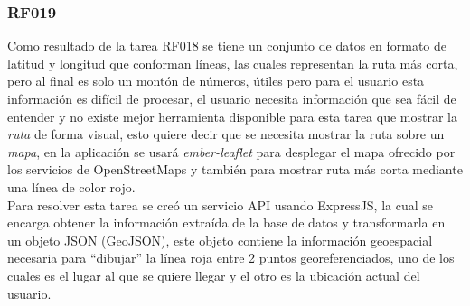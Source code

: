 

\subsubsection{RF019}
\label{subs:RF019}
Como resultado de la tarea RF018 se tiene un conjunto de datos en formato de latitud y longitud que conforman líneas, las cuales representan la ruta más corta, pero al final es solo un montón de números, útiles pero para el usuario esta información es difícil de procesar, el usuario necesita información que sea fácil de entender y no existe mejor herramienta disponible para esta tarea que mostrar la \emph{ruta} de forma visual, esto quiere decir que se necesita mostrar la ruta sobre un \emph{mapa}, en la aplicación se usará \emph{ember-leaflet} para desplegar el mapa ofrecido por los servicios de OpenStreetMaps y también para mostrar ruta más corta mediante una línea de color rojo.\\

Para resolver esta tarea se creó un servicio API usando ExpressJS, la cual se encarga obtener la información extraída de la base de datos y transformarla en un objeto JSON (GeoJSON), este objeto contiene la información geoespacial necesaria para ``dibujar'' la línea roja entre 2 puntos georeferenciados, uno de los cuales es el lugar al que se quiere llegar y el otro es la ubicación actual del usuario. \\

